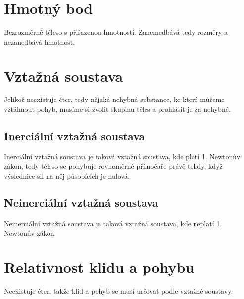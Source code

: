 \documentclass[titlepage]{book}
\begin{document}
\section{Hmotný bod}
Bezrozměrné těleso s přiřazenou hmotností. Zanemedbává tedy rozměry a nezanedbává hmotnost.
\section{Vztažná soustava}
Jelikož neexistuje éter, tedy nějaká nehybná substance, ke které můžeme vztáhnout pohyb, musíme si zvolit skupinu těles a prohlásit je za nehybné.
\subsection{Inerciální vztažná soustava}
Inerciální vztažná soustava je taková vztažná soustava, kde platí 1. Newtonův zákon, tedy těleso se pohybuje rovnoměrně přímočaře právě tehdy, když výslednice sil na něj působících je nulová.
\subsection{Neinerciální vztažná soustava}
Neinerciální vztažná soustava je taková vztažná soustava, kde neplatí 1. Newtonův zákon.
\section{Relativnost klidu a pohybu}
Neexistuje éter, takže klid a pohyb se musí určovat podle vztažné soustavy.
\end{document}
